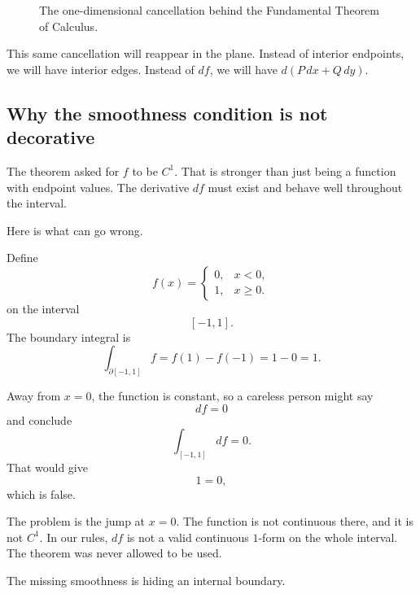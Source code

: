 \begin{figure}[h]
\centering
{}
\caption{The one-dimensional cancellation behind the Fundamental Theorem of Calculus.}
\end{figure}

This same cancellation will reappear in the plane.  Instead of interior endpoints, we
will have interior edges.  Instead of \(df\), we will have \(d(P\,dx+Q\,dy)\).

\subsection{Why the smoothness condition is not decorative}

The theorem asked for \(f\) to be \(C^1\).  That is stronger than just being a function
with endpoint values.  The derivative \(df\) must exist and behave well throughout the
interval.

Here is what can go wrong.

\begin{example}
Define
\[
    f(x)=
    \begin{cases}
    0, & x<0,\\
    1, & x\ge 0.
    \end{cases}
\]
on the interval
\[
    [-1,1].
\]
The boundary integral is
\[
    \int_{\partial[-1,1]}f=f(1)-f(-1)=1-0=1.
\]

Away from \(x=0\), the function is constant, so a careless person might say
\[
    df=0
\]
and conclude
\[
    \int_{[-1,1]}df=0.
\]
That would give
\[
    1=0,
\]
which is false.

The problem is the jump at \(x=0\).  The function is not continuous there, and it is not
\(C^1\).  In our rules, \(df\) is not a valid continuous \(1\)-form on the whole interval.
The theorem was never allowed to be used.

The missing smoothness is hiding an internal boundary.
\end{example}

